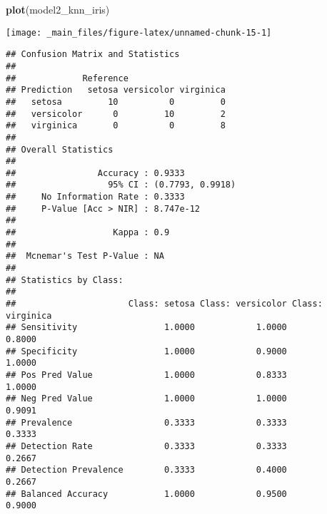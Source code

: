 \documentclass[]{book}
\newenvironment{Shaded}{\begin{snugshade}}{\end{snugshade}}
\newcommand{\CommentTok}[1]{\textcolor[rgb]{0.56,0.35,0.01}{\textit{#1}}}
\newcommand{\DataTypeTok}[1]{\textcolor[rgb]{0.13,0.29,0.53}{#1}}
\newcommand{\KeywordTok}[1]{\textcolor[rgb]{0.13,0.29,0.53}{\textbf{#1}}}
\newcommand{\NormalTok}[1]{#1}
\newcommand{\OperatorTok}[1]{\textcolor[rgb]{0.81,0.36,0.00}{\textbf{#1}}}
\newcommand{\StringTok}[1]{\textcolor[rgb]{0.31,0.60,0.02}{#1}}
\begin{document}
\begin{Shaded}
\begin{Highlighting}[]
\KeywordTok{plot}\NormalTok{(model2_knn_iris)}
\end{Highlighting}
\end{Shaded}

\begin{center}\texttt{[image: \_main\_files/figure-latex/unnamed-chunk-15-1]} \end{center}

\begin{Shaded}
\end{Shaded}

\begin{verbatim}
## Confusion Matrix and Statistics
## 
##             Reference
## Prediction   setosa versicolor virginica
##   setosa         10          0         0
##   versicolor      0         10         2
##   virginica       0          0         8
## 
## Overall Statistics
##                                           
##                Accuracy : 0.9333          
##                  95% CI : (0.7793, 0.9918)
##     No Information Rate : 0.3333          
##     P-Value [Acc > NIR] : 8.747e-12       
##                                           
##                   Kappa : 0.9             
##                                           
##  Mcnemar's Test P-Value : NA              
## 
## Statistics by Class:
## 
##                      Class: setosa Class: versicolor Class: virginica
## Sensitivity                 1.0000            1.0000           0.8000
## Specificity                 1.0000            0.9000           1.0000
## Pos Pred Value              1.0000            0.8333           1.0000
## Neg Pred Value              1.0000            1.0000           0.9091
## Prevalence                  0.3333            0.3333           0.3333
## Detection Rate              0.3333            0.3333           0.2667
## Detection Prevalence        0.3333            0.4000           0.2667
## Balanced Accuracy           1.0000            0.9500           0.9000
\end{verbatim}
\end{document}
